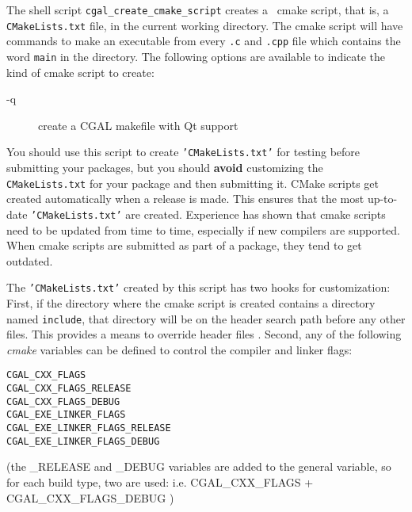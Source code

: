 The shell script
{{\tt cgal\_create\_cmake\_script}} creates a \cgal\ cmake script, that is, a {\tt CMakeLists.txt} file,
in the current working directory.
The cmake script will have commands to make an executable from every {\tt .c}
and {\tt .cpp} file which contains the word {\tt main} in the directory.
The following options are available to indicate the kind of cmake script
to create:
\begin{description}
\item[-q]   create a CGAL makefile with Qt support
\end{description}


You should use this script to create {\tt 'CMakeLists.txt'} for testing before submitting
your packages, but you should {\bf avoid} customizing the {\tt CMakeLists.txt} for your
package and then submitting it. 
CMake scripts get created automatically when a release is made. This ensures
that the most up-to-date {\tt 'CMakeLists.txt'} are created. Experience has shown
that cmake scripts need to be updated from time to time, especially if new
compilers are supported. When cmake scripts are submitted as part of a package,
they tend to get outdated.

The {\tt 'CMakeLists.txt'} created by this script has two hooks for customization:
First, if the directory
where the cmake script is created contains a directory named {\tt include},%
that directory will be on the header search path before any other files. This
provides a means to override header files%
.
Second, any of the following {\em cmake } variables can be defined
to control the compiler and linker flags:

\begin{verbatim}
CGAL_CXX_FLAGS
CGAL_CXX_FLAGS_RELEASE
CGAL_CXX_FLAGS_DEBUG
CGAL_EXE_LINKER_FLAGS
CGAL_EXE_LINKER_FLAGS_RELEASE
CGAL_EXE_LINKER_FLAGS_DEBUG
\end{verbatim}

(the \_RELEASE and \_DEBUG variables are added to the general variable, so for each
build type, two are used: i.e. CGAL\_CXX\_FLAGS + CGAL\_CXX\_FLAGS\_DEBUG )



